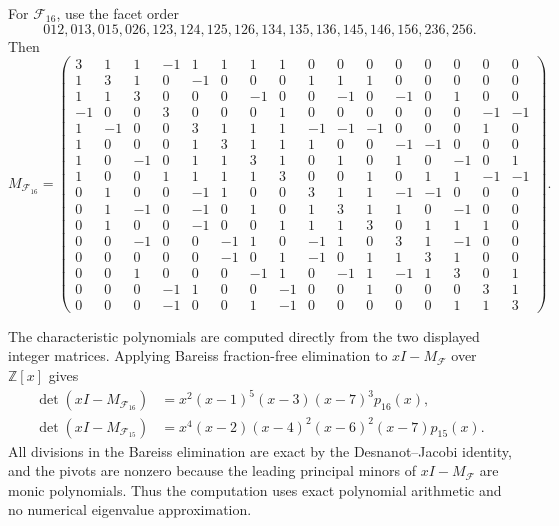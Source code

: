 \documentclass[11pt]{article}
\newcommand{\calF}{\mathcal{F}}
\begin{document}
	For \(\calF_{16}\), use the facet order
	\[
	012,013,015,026,123,124,125,126,
	134,135,136,145,146,156,236,256.
	\]
	Then
\begingroup
\normalsize
\setlength{\arraycolsep}{1.7pt}
\[
M_{\calF_{16}}=
\left(\begin{array}{*{16}{c}}
3& 1& 1&-1& 1& 1& 1& 1& 0& 0& 0& 0& 0& 0& 0& 0\\
		1& 3& 1& 0&-1& 0& 0& 0& 1& 1& 1& 0& 0& 0& 0& 0\\
		1& 1& 3& 0& 0& 0&-1& 0& 0&-1& 0&-1& 0& 1& 0& 0\\
		-1& 0& 0& 3& 0& 0& 0& 1& 0& 0& 0& 0& 0& 0&-1&-1\\
		1&-1& 0& 0& 3& 1& 1& 1&-1&-1&-1& 0& 0& 0& 1& 0\\
		1& 0& 0& 0& 1& 3& 1& 1& 1& 0& 0&-1&-1& 0& 0& 0\\
		1& 0&-1& 0& 1& 1& 3& 1& 0& 1& 0& 1& 0&-1& 0& 1\\
		1& 0& 0& 1& 1& 1& 1& 3& 0& 0& 1& 0& 1& 1&-1&-1\\
		0& 1& 0& 0&-1& 1& 0& 0& 3& 1& 1&-1&-1& 0& 0& 0\\
		0& 1&-1& 0&-1& 0& 1& 0& 1& 3& 1& 1& 0&-1& 0& 0\\
		0& 1& 0& 0&-1& 0& 0& 1& 1& 1& 3& 0& 1& 1& 1& 0\\
		0& 0&-1& 0& 0&-1& 1& 0&-1& 1& 0& 3& 1&-1& 0& 0\\
		0& 0& 0& 0& 0&-1& 0& 1&-1& 0& 1& 1& 3& 1& 0& 0\\
		0& 0& 1& 0& 0& 0&-1& 1& 0&-1& 1&-1& 1& 3& 0& 1\\
		0& 0& 0&-1& 1& 0& 0&-1& 0& 0& 1& 0& 0& 0& 3& 1\\
		0& 0& 0&-1& 0& 0& 1&-1& 0& 0& 0& 0& 0& 1& 1& 3
\end{array}\right).
\]
\endgroup

The characteristic polynomials are computed directly from the two
displayed integer matrices. Applying Bareiss fraction-free elimination \cite{Bareiss1968}
to \(xI-M_{\calF}\) over \(\mathbb Z[x]\) gives
\[
\begin{aligned}
\det(xI-M_{\calF_{16}})
&=x^2(x-1)^5(x-3)(x-7)^3p_{16}(x),\\
\det(xI-M_{\calF_{15}})
&=x^4(x-2)(x-4)^2(x-6)^2(x-7)p_{15}(x).
\end{aligned}
\]
All divisions in the Bareiss elimination are exact by the
Desnanot--Jacobi identity, and the pivots are nonzero because the
leading principal minors of \(xI-M_{\calF}\) are monic polynomials.
Thus the computation uses exact polynomial arithmetic and no numerical
eigenvalue approximation.
\end{document}
